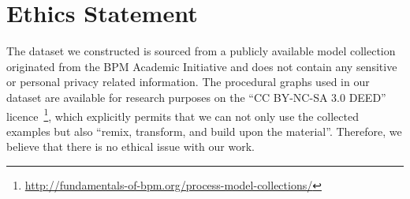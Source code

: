 

\section{Ethics Statement
}

The dataset we constructed is sourced from a publicly available model collection originated from the BPM Academic Initiative and does not contain any sensitive or personal privacy related information.
The procedural graphs used in our dataset are available for research purposes on the ``CC BY-NC-SA 3.0 DEED'' licence~\footnote{\url{http://fundamentals-of-bpm.org/process-model-collections/}}, which explicitly permits that we can not only use the collected examples but also ``remix, transform, and build upon the material''.
Therefore, we believe that there is no ethical issue with our work.